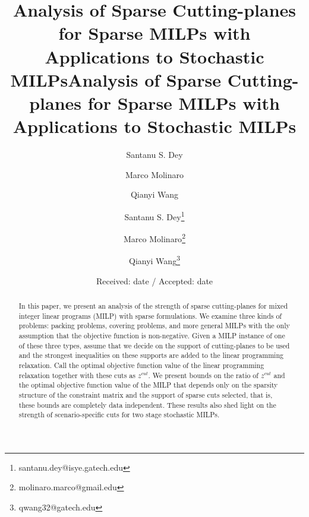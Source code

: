 \documentclass[smallextended]{svjour3}
\begin{document}
\ifmp
	\title{Analysis of Sparse Cutting-planes for Sparse MILPs with Applications to Stochastic MILPs}
	
	
	\author{Santanu S. Dey \and Marco Molinaro \and Qianyi Wang}
	


	\date{Received: date / Accepted: date}
	

\else
	\title{Analysis of Sparse Cutting-planes for Sparse MILPs with Applications to Stochastic MILPs}
	\author[1]{Santanu S. Dey\thanks{santanu.dey@isye.gatech.edu}}
	\author[2]{Marco Molinaro\thanks{molinaro.marco@gmail.edu}}
	\author[1]{Qianyi Wang\thanks{qwang32@gatech.edu}}
\fi

\maketitle

\begin{abstract}
In this paper, we present an analysis of the strength of sparse cutting-planes for mixed integer linear programs (MILP) with sparse formulations.  We examine three kinds of problems: packing problems, covering problems, and more general MILPs with the only assumption that the objective function is non-negative. Given a MILP instance of one of these three types, assume that we decide on the support of cutting-planes to be used and the strongest inequalities on these supports are added to the linear programming relaxation. Call the optimal objective function value of the linear programming relaxation together with these cuts as $z^{cut}$.  We present bounds on the ratio of $z^{cut}$ and the optimal objective function value of the MILP that depends only on the sparsity structure of the constraint matrix and the support of sparse cuts selected, that is, these bounds are completely data independent. These results also shed light on the strength of scenario-specific cuts for two stage stochastic MILPs.

\ifmp
	
	
\fi

\end{abstract}
\end{document}
